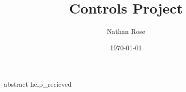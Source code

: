 \documentclass[11pt]{article}
\title{Controls Project}
\author{Nathan Rose}
\date{\today}
\begin{document}
\maketitle
{abstract}
{help_recieved}
\end{document}
